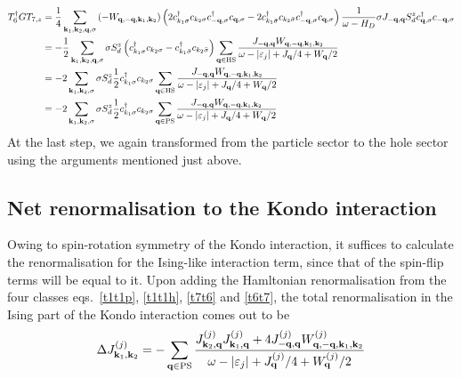 \documentclass{revtex4-2}
\begin{document}
\begin{equation}\begin{aligned}\label{t6t7}
	T_{6}^\dagger G T_{7,z} &= \frac{1}{4}\sum_{{\bf k}_1,{\bf k}_2,{\bf q},\sigma} \left(- W_{{\bf q},-{\bf q},{\bf k}_1, {\bf k}_2}\right) \left(2 c^\dagger_{k_1\sigma}c_{k_2\sigma}c^\dagger_{-{\bf q},\sigma}c_{{\bf q},\sigma} - 2 c^\dagger_{k_1\bar\sigma}c_{k_2\bar\sigma}c^\dagger_{-{\bf q},\sigma}c_{{\bf q},\sigma}\right) \frac{1}{\omega - H_D} \sigma J_{-{\bf q},{\bf q}}S_d^z c^\dagger_{{\bf q},\sigma} c_{-{\bf q},\sigma}\\
			      &= -\frac{1}{2}\sum_{{\bf k}_1,{\bf k}_2,{\bf q},\sigma}\sigma S_d^z \left(c^\dagger_{k_1\sigma}c_{k_2\sigma} - c^\dagger_{k_1\bar\sigma}c_{k_2\bar\sigma}\right) \sum_{{\bf q} \in \text{HS}}\frac{J_{-{\bf q},{\bf q}} W_{{\bf q},-{\bf q},{\bf k}_1, {\bf k}_2}}{\omega - |\varepsilon_j| + J_{{\bf q}}/4 + W_{{\bf q}}/2} \\
			      &= -2\sum_{{\bf k}_1,{\bf k}_2,\sigma}\sigma S_d^z \frac{1}{2} c^\dagger_{k_1\sigma}c_{k_2\sigma} \sum_{{\bf q} \in \text{HS}}\frac{J_{-{\bf q},{\bf q}} W_{{\bf q},-{\bf q},{\bf k}_1, {\bf k}_2}}{\omega - |\varepsilon_j| + J_{{\bf q}}/4 + W_{{\bf q}}/2} \\
			      &= -2\sum_{{\bf k}_1,{\bf k}_2,\sigma}\sigma S_d^z \frac{1}{2} c^\dagger_{k_1\sigma}c_{k_2\sigma} \sum_{{\bf q} \in \text{PS}}\frac{J_{-{\bf q},{\bf q}} W_{{\bf q},-{\bf q},{\bf k}_1, {\bf k}_2}}{\omega - |\varepsilon_j| + J_{{\bf q}}/4 + W_{{\bf q}}/2} \\
\end{aligned}\end{equation}
At the last step, we again transformed from the particle sector to the hole sector using the arguments mentioned just above.

\subsection{Net renormalisation to the Kondo interaction}
Owing to spin-rotation symmetry of the Kondo interaction, it suffices to calculate the renormalisation for the Ising-like interaction term, since that of the spin-flip terms will be equal to it. Upon adding the Hamltonian renormalisation from the four classes eqs.~\ref{t1t1p}, \ref{t1t1h}, \ref{t7t6} and \ref{t6t7}, the total renormalisation in the Ising part of the Kondo interaction comes out to be
\begin{equation}\begin{aligned}
	\Delta J^{(j)}_{{\bf k}_1, {\bf k}_2} = -\sum_{{\bf q} \in \text{PS}} \frac{J^{(j)}_{{\bf k}_2,{\bf q}} J^{(j)}_{{\bf k}_1,{\bf q}} + 4J^{(j)}_{-{\bf q},{\bf q}} W^{(j)}_{{\bf q},-{\bf q},{\bf k}_1, {\bf k}_2}}{\omega - |\varepsilon_j| + J^{(j)}_{{\bf q}}/4 + W^{(j)}_{{\bf q}}/2}
\end{aligned}\end{equation}
\end{document}
